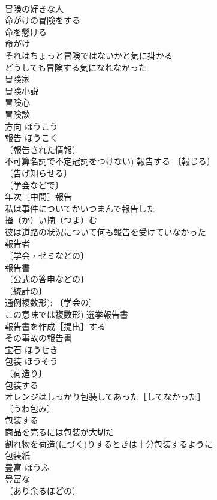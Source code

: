\documentclass[8pt]{extreport}
\begin{document}
\begin{CJK}{UTF8}{min}
\\	冒険の好きな人 
\\	命がけの冒険をする 
\\	命を懸ける　
\\	命がけ 
\\	それはちょっと冒険ではないかと気に掛かる 
\\	どうしても冒険する気になれなかった 
\\	冒険家 
\\	冒険小説 
\\	冒険心 
\\	冒険談 
\\	方向	ほうこう	
\\	報告	ほうこく	
\\	〔報告された情報〕
\\	不可算名詞で不定冠詞をつけない) 報告する 〔報じる〕
\\	〔告げ知らせる〕
\\	〔学会などで〕
\\	年次［中間］報告 
\\	私は事件についてかいつまんで報告した
\\	掻（か）い摘（つま）む　
\\	彼は道路の状況について何も報告を受けていなかった 
\\	報告者 
\\	〔学会・ゼミなどの〕
\\	報告書 
\\	〔公式の答申などの〕
\\	〔統計の〕
\\	通例複数形); 〔学会の〕
\\	この意味では複数形) 選挙報告書 
\\	報告書を作成［提出］する 
\\	その事故の報告書 
\\	宝石	ほうせき	
\\	包装	ほうそう	
\\	〔荷造り〕
\\	包装する 
\\	オレンジはしっかり包装してあった［してなかった］ 
\\	〔うわ包み〕
\\	包装する 
\\	商品を売るには包装が大切だ 
\\	割れ物を荷造(にづく)りするときは十分包装するように 
\\	包装紙 
\\	豊富	ほうふ	
\\	豊富な 
\\	〔あり余るほどの〕

\end{CJK}
\end{document}
